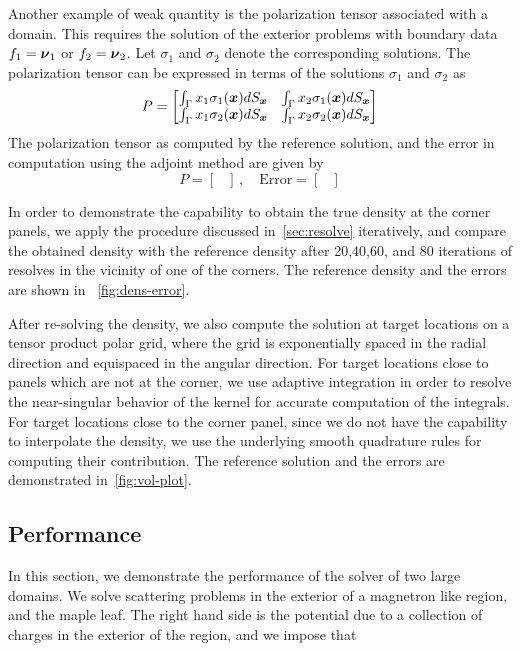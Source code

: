 Another example of weak quantity is the polarization tensor associated with a domain. This requires the solution of the
exterior problems with boundary data $f_{1} = \boldsymbol{\nu}_{1}$ or $f_{2} = \boldsymbol{\nu}_{2}$. Let $\sigma_{1}$ and $\sigma_{2}$ denote
the corresponding solutions. The polarization tensor can be expressed in terms of the solutions $\sigma_{1}$ and $\sigma_{2}$
as
\begin{equation}
P = \begin{bmatrix}
\int_{\Gamma} x_{1} \sigma_{1}(\boldsymbol{x}) dS_{\boldsymbol{x}} & \int_{\Gamma} x_{2} \sigma_{1}(\boldsymbol{x}) dS_{\boldsymbol{x}} \\
\int_{\Gamma} x_{1} \sigma_{2}(\boldsymbol{x}) dS_{\boldsymbol{x}} & \int_{\Gamma} x_{2} \sigma_{2}(\boldsymbol{x}) dS_{\boldsymbol{x}} 
\end{bmatrix}
\end{equation}
The polarization tensor as computed by the reference solution, and the error in computation using the adjoint method
are given by
\begin{equation}
P = \begin{bmatrix}
\end{bmatrix} \, , \quad \text{Error} = 
\begin{bmatrix} 
\end{bmatrix}
\end{equation}

In order to demonstrate the capability to obtain the true density at the corner panels, we  apply the procedure
discussed in~\cref{sec:resolve} iteratively, and compare the obtained density with the reference density after 20,40,60, and
80 iterations of resolves in the vicinity of one of the corners. The reference density and the errors are shown in ~\cref{fig:dens-error}. 

After re-solving the density, we also compute the solution at target locations on a tensor product polar grid, where the grid
is exponentially spaced in the radial direction and equispaced in the angular direction. For target locations
close to panels which are not at the corner, we use adaptive integration in order to resolve the near-singular behavior of
the kernel for accurate computation of the integrals. For target locations close to the corner panel, since we do not have
the capability to interpolate the density, we use the underlying smooth quadrature rules for computing their contribution. 
The reference solution and the errors are demonstrated in~\cref{fig:vol-plot}.
\subsection{Performance}
In this section, we demonstrate the performance of the solver of two large domains. We solve scattering problems in the
exterior of a magnetron like region, and the maple leaf. The right hand side is the potential due to a collection of charges in the exterior of the region, and we impose that 